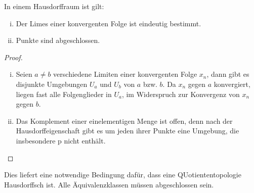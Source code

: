 \documentclass[a4paper,10pt]{scrartcl}
\begin{document}
\begin{st}
In einem Hausdorffraum ist gilt:
\begin{enumerate}[(i)]
\item Der Limes einer konvergenten Folge ist eindeutig bestimmt.
\item Punkte sind abgeschlossen.
\end{enumerate}
\end{st}
\begin{proof}
\begin{enumerate}[(i)]
\item Seien $ a\neq b $ verschiedene Limiten einer konvergenten Folge $ x_n $, dann gibt es disjunkte Umgebungen $ U_a $ und $ U_b $ von $ a $ bzw. $ b $.  Da $ x_n $ gegen $ a $ konvergiert, liegen fast alle Folgenglieder in $ U_a $, im Widerspruch zur Konvergenz von $ x_n $ gegen $ b $.
\item Das Komplement einer einelementigen Menge ist offen, denn nach der Hausdorffeigenschaft gibt es um jeden ihrer Punkte eine Umgebung, die insbesondere p nicht enthält.
\end{enumerate}
\end{proof}
\fixme[fig18]
\begin{note*}
Dies liefert eine notwendige Bedingung dafür, dass eine QUotiententopologie Hausdorffsch ist.  Alle Äquivalenzklassen müssen abgeschlossen sein.
\end{note*}
\end{document}
